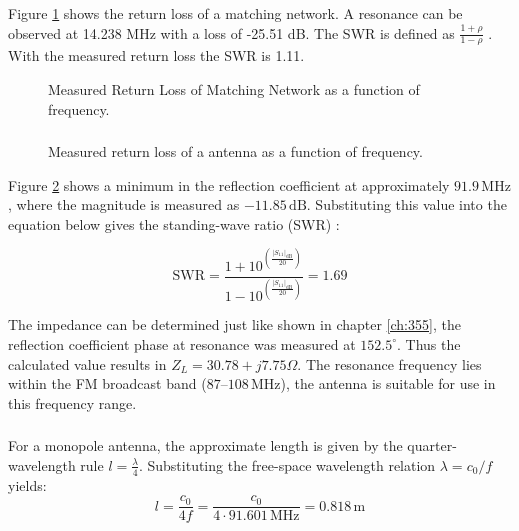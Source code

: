 \documentclass[a4paper,12pt]{article}
\begin{document}
	
	\subsubsection{}
	Figure \ref{fig:357} shows the return loss of a matching network. A resonance can be observed at 14.238 MHz with a loss of -25.51 dB. The SWR is defined as $\frac{1+\rho}{1-\rho}$ \cite{bangert}. With the measured return loss the SWR is 1.11.
	\begin{figure}[H]
		\centering
		
		\caption{Measured Return Loss of Matching Network as a function of frequency.}
		\label{fig:357}
	\end{figure}
	
	\subsubsection{}
	\begin{figure}[H]
		\centering
		
		\caption{Measured return loss of a antenna as a function of frequency.}
		\label{fig:358}
	\end{figure}
	Figure \ref{fig:358} shows a minimum in the reflection coefficient at approximately \(91.9\,\mathrm{MHz}\), where the magnitude is measured as \(-11.85\,\mathrm{dB}\). Substituting this value into the equation below gives the standing-wave ratio (SWR) \cite{bangert}:
	
	\[
	\mathrm{SWR} = \frac{1 + 10^{\left(\frac{|S_{11}|_{\mathrm{dB}}}{20}\right)}}{1 - 10^{\left(\frac{|S_{11}|_{\mathrm{dB}}}{20}\right)}} = 1.69
	\]
	
	The impedance can be determined just like shown in chapter \ref{ch:355}, the reflection coefficient phase at resonance was measured at \(152.5^\circ\). Thus the calculated value results in $Z_L=30.78 + j7.75 \Omega$.
	The resonance frequency lies within the FM broadcast band (\(87\)--\(108\,\mathrm{MHz}\)), the antenna is suitable for use in this frequency range.

	
	
	
	\subsubsection{}
	For a monopole antenna, the approximate length is given by the quarter-wavelength rule $l = \frac{\lambda}{4}$.
	Substituting the free-space wavelength relation \(\lambda = c_0 / f\) yields:
	\[
	l = \frac{c_0}{4 f} = \frac{c_0}{4 \cdot 91.601\,\mathrm{MHz}} = 0.818\,\mathrm{m}
	\]
	
	\subsubsection{}
	
\end{document}
